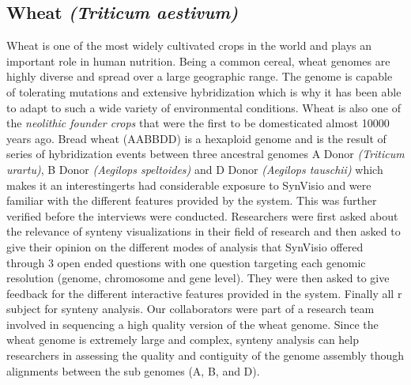 \subsection{Wheat\textit{ (Triticum aestivum)}}
Wheat is one of the most widely cultivated crops in the world and plays an important role in human nutrition. Being a common cereal, wheat genomes are highly diverse and spread over a large geographic range. The genome is capable of tolerating mutations and extensive hybridization which is why it has been able to adapt to such a wide variety of environmental conditions\cite{wheatinfo,10wheat}. Wheat is also one of the \textit{neolithic founder crops} that were the first to be domesticated almost 10000 years ago.
Bread wheat (AABBDD) is a hexaploid genome and is the result of series of hybridization events between three ancestral genomes A Donor\textit{ (Triticum urartu)}, B Donor\textit{ (Aegilops speltoides)} and D Donor\textit{ (Aegilops tauschii)} which makes it an interestingerts had considerable exposure to SynVisio and were familiar with the different features provided by the system. This was further verified before the interviews were conducted. Researchers were first asked about the relevance of synteny visualizations in their field of research and then asked to give their opinion on the different modes of analysis that SynVisio offered through 3 open ended questions with one question targeting each genomic resolution (genome, chromosome and gene level). They were then asked to give feedback for the different interactive features provided in the system. Finally all r subject for synteny analysis. Our collaborators were part of a research team involved in sequencing a high quality version of the wheat genome. Since the wheat genome is extremely large and complex, synteny analysis can help researchers in assessing the quality and contiguity of the genome assembly though alignments between the sub genomes (A, B, and D).

